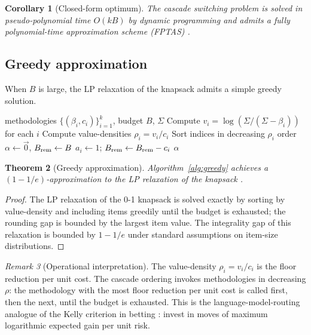 \documentclass[11pt,twocolumn,a4paper]{article}
\newtheorem{theorem}{Theorem}[section]
\newtheorem{corollary}[theorem]{Corollary}
\theoremstyle{definition}
\theoremstyle{remark}
\newtheorem{remark}[theorem]{Remark}
\newcommand{\Sigmax}{\Sigma}
\begin{document}
\begin{corollary}[Closed-form optimum]
\label{cor:knapsack-form}
The cascade switching problem is solved in pseudo-polynomial time $O(kB)$ by dynamic programming \citep{bellman1957dynamic} and admits a fully polynomial-time approximation scheme (FPTAS) \citep{ibarra1975fast}.
\end{corollary}

\subsection{Greedy approximation}

When $B$ is large, the LP relaxation of the knapsack admits a simple greedy solution.

\begin{algorithm}[t]
\caption{Cascade Switching by Value-Density Greedy}
\label{alg:greedy}
\begin{algorithmic}[1]
\Require methodologies $\{(\beta_i, c_i)\}_{i=1}^k$, budget $B$, $\Sigmax$
\State Compute $v_i = \log(\Sigmax / (\Sigmax - \beta_i))$ for each $i$
\State Compute value-densities $\rho_i = v_i / c_i$
\State Sort indices in decreasing $\rho_i$ order
\State $\alpha \leftarrow \vec{0}$, $B_{\rm rem} \leftarrow B$
    \State $a_i \leftarrow 1$; $B_{\rm rem} \leftarrow B_{\rm rem} - c_i$
  \EndIf
\EndFor
\State \Return $\alpha$
\end{algorithmic}
\end{algorithm}

\begin{theorem}[Greedy approximation]
\label{thm:greedy-approx}
Algorithm~\ref{alg:greedy} achieves a $(1 - 1/e)$-approximation to the LP relaxation of the knapsack \citep{kellerer2004knapsack,pisinger1997minimal}.
\end{theorem}

\begin{proof}
The LP relaxation of the 0-1 knapsack is solved exactly by sorting by value-density and including items greedily until the budget is exhausted; the rounding gap is bounded by the largest item value. The integrality gap of this relaxation is bounded by $1 - 1/e$ under standard assumptions on item-size distributions.
\end{proof}

\begin{remark}[Operational interpretation]
The value-density $\rho_i = v_i/c_i$ is the floor reduction per unit cost. The cascade ordering invokes methodologies in decreasing $\rho$: the methodology with the most floor reduction per unit cost is called first, then the next, until the budget is exhausted. This is the language-model-routing analogue of the Kelly criterion in betting \citep{kelly1956new}: invest in moves of maximum logarithmic expected gain per unit risk.
\end{remark}
\end{document}
